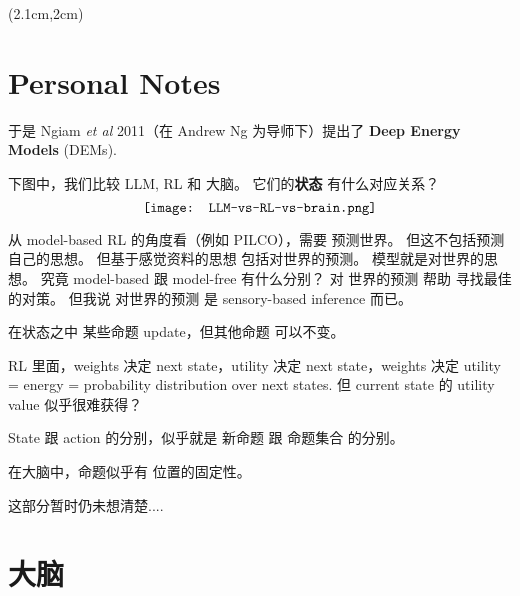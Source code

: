 \begin{preview}
\begin{minipage}{\textwidth}
\setlength{\parskip}{0.4\baselineskip}

\begin{textblock*}{20cm}(2.1cm,2cm) %
	{}
	\hspace{8cm}
\end{textblock*}
\vspace*{0.3cm} 

\section{Personal Notes}

于是 Ngiam \textit{et al} 2011（在 Andrew Ng 为导师下）提出了 \textbf{Deep Energy Models} (DEMs).

下图中，我们比较 LLM, RL 和 大脑。 它们的\textbf{状态} 有什么对应关系？ 
\begin{equation}
\vcenter{\hbox{\texttt{[image: LLM-vs-RL-vs-brain.png]}}}
\end{equation}

从 model-based RL 的角度看（例如 PILCO），需要 预测世界。 但这不包括预测自己的思想。 但基于感觉资料的思想 包括对世界的预测。 模型就是对世界的思想。 究竟 model-based 跟 model-free 有什么分别？  对 世界的预测 帮助 寻找最佳的对策。 但我说 对世界的预测 是 sensory-based inference 而已。  

在状态之中 某些命题 update，但其他命题 可以不变。 

RL 里面，weights 决定 next state，utility 决定 next state，weights 决定 utility = energy = probability distribution over next states.  但 current state 的 utility value 似乎很难获得？  

State 跟 action 的分别，似乎就是 新命题 跟 命题集合 的分别。 

在大脑中，命题似乎有 位置的固定性。 

\underconst \quad 这部分暂时仍未想清楚....

\section{大脑}

\end{minipage}
\end{preview}


